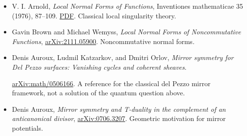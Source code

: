 \begin{itemize}
\item V. I. Arnold,
\textit{Local Normal Forms of Functions},
Inventiones mathematicae 35 (1976),
87--109.
\href{https://webhomes.maths.ed.ac.uk/%
~v1ranick/papers/arnold15.pdf}{PDF}.
Classical local singularity theory.

\item Gavin Brown and Michael Wemyss,
\textit{Local Normal Forms of
Noncommutative Functions},
\href{https://arxiv.org/abs/2111.05900}
{arXiv:2111.05900}.
Noncommutative normal forms.

\item Denis Auroux, Ludmil Katzarkov,
and Dmitri Orlov,
\textit{Mirror symmetry for Del Pezzo
surfaces: Vanishing cycles and
coherent sheaves}.
\par
\href{https://arxiv.org/abs/math/0506166}
{arXiv:math/0506166}.
A reference for the classical
del Pezzo mirror framework, not a
solution of the quantum question above.

\item Denis Auroux,
\textit{Mirror symmetry and T-duality
in the complement of an anticanonical
divisor},
\href{https://arxiv.org/abs/0706.3207}
{arXiv:0706.3207}.
Geometric motivation for mirror
potentials.
\end{itemize}


